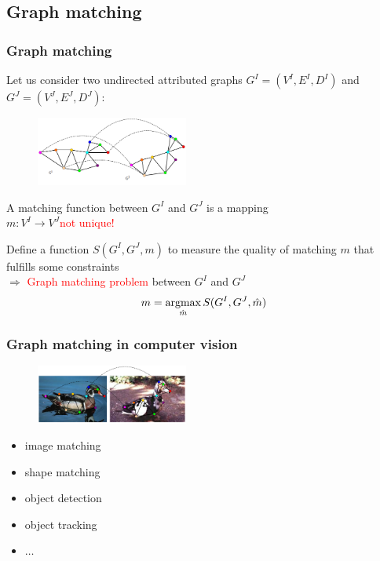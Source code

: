 \documentclass[handout]{beamer}
\def\argmax{\mathop{\rm argmax}}						%
\begin{document}
\subsection{Graph matching}
\begin{frame}
\frametitle{Graph matching}
Let us consider two undirected attributed graphs $G^I = (V^I, E^I, D^I)$ and $G^J = (V^J, E^J,D^J)$: %
\begin{figure}[t]
        \centering
        \includegraphics[width=5cm]{fig/matching_12.pdf}
\end{figure}
A matching function between $G^I$ and $G^J$ is a mapping %
\\
{\hspace{4cm}$m:V^I\rightarrow V^J$}\textcolor{red}{\hspace{2cm}not unique!}

Define a function $S(G^I, G^J, m)$ to measure the quality of matching $m$ that fulfills some constraints\\
$\Rightarrow$ \textcolor{red}{Graph matching problem} between $G^I$ and $G^J$ 
\begin{equation*}
m = \argmax_{\hat{m}}S(G^I, G^J, \hat{m})
\end{equation*}

\end{frame}
\begin{frame}
\frametitle{Graph matching in computer vision}
\begin{figure}[t]
    \centering
    \includegraphics[width=5cm]{fig/ducks_12.pdf}
\end{figure}
\begin{itemize}
\item image matching
\item shape matching
\item object detection
\item object tracking
\item $\dots$
\end{itemize}
\end{frame}
\end{document}
